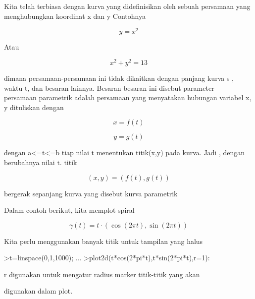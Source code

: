\documentclass[a4paper,10pt]{article}
\begin{document}
\begin{eulernotebook}
\begin{eulercomment}
\begin{eulercomment}
\begin{eulercomment}
Kita telah terbiasa dengan kurva yang didefinisikan oleh sebuah
persamaan yang menghubungkan koordinat x dan y Contohnya\\
\end{eulercomment}
\begin{eulerformula}
\[
y=x^2
\]
\end{eulerformula}
\begin{eulercomment}
Atau\\
\end{eulercomment}
\begin{eulerformula}
\[
x^2+y^2=13
\]
\end{eulerformula}
\begin{eulercomment}
dimana persamaan-persamaan ini tidak dikaitkan dengan panjang kurva s
, waktu t, dan besaran lainnya. Besaran besaran ini disebut parameter\\
persamaan parametrik adalah persamaan yang menyatakan hubungan
variabel x, y dituliskan dengan\\
\end{eulercomment}
\begin{eulerformula}
\[
x=f(t)
\]
\end{eulerformula}
\begin{eulerformula}
\[
y=g(t)
\]
\end{eulerformula}
\begin{eulercomment}
dengan a\textless{}=t\textless{}=b tiap nilai t menentukan titik(x,y) pada kurva. Jadi ,
dengan berubahnya nilai t. titik\\
\end{eulercomment}
\begin{eulerformula}
\[
(x,y) = (f(t),g(t))
\]
\end{eulerformula}
\begin{eulercomment}
bergerak sepanjang kurva yang disebut kurva parametrik


Dalam contoh berikut, kita memplot spiral

\end{eulercomment}
\begin{eulerformula}
\[
\gamma(t) = t \cdot (\cos(2\pi t),\sin(2\pi t))
\]
\end{eulerformula}
\begin{eulercomment}
Kita perlu menggunakan banyak titik untuk tampilan yang halus
\end{eulercomment}
\begin{eulerprompt}
>t=linspace(0,1,1000); ...
>plot2d(t*cos(2*pi*t),t*sin(2*pi*t),r=1):
\end{eulerprompt}
\begin{eulerttcomment}
 r digunakan untuk mengatur radius marker titik-titik yang akan
\end{eulerttcomment}
\begin{eulercomment}
digunakan dalam plot.




\end{eulercomment}
\end{eulercomment}
\end{eulercomment}
\end{eulernotebook}
\end{document}
